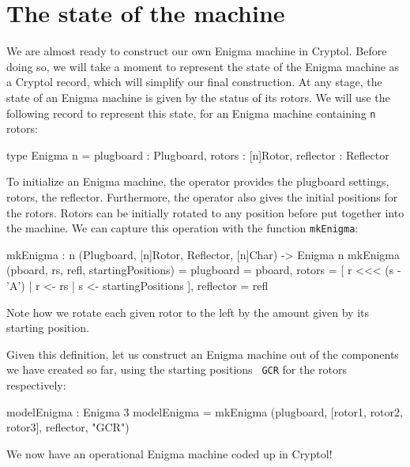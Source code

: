 \section{The state of the machine}
\label{sec:state-machine}

We are almost ready to construct our own Enigma machine in
Cryptol. Before doing so, we will take a moment to represent the state
of the Enigma machine as a Cryptol record\indTheRecordType, which will
simplify our final construction. At any stage, the state of an Enigma
machine is given by the status of its rotors. We will use the
following record to represent this state, for an Enigma machine
containing \texttt{n} rotors:
\begin{code}
  type Enigma n = { plugboard : Plugboard,
                    rotors    : [n]Rotor,
                    reflector : Reflector
                  }
\end{code}
To initialize an Enigma machine, the operator provides the plugboard
settings, rotors, the reflector. Furthermore, the operator also gives
the initial positions for the rotors.  Rotors can be initially rotated
to any position before put together into the machine. We can capture
this operation with the function {\tt mkEnigma}:
\begin{code}
  mkEnigma : {n} (Plugboard, [n]Rotor, Reflector, [n]Char) 
                 -> Enigma n
  mkEnigma (pboard, rs, refl, startingPositions) =
      { plugboard  = pboard,
        rotors     = [ r <<< (s - 'A')
                     | r <- rs
                     | s <- startingPositions
                     ],
        reflector  = refl
      }
\end{code}
Note how we rotate each given rotor to the left by the amount given by
its starting position.


Given this definition, let us construct an Enigma machine out of the
components we have created so far, using the starting positions {\tt
  GCR} for the rotors respectively:\label{def:modelEnigma}
\begin{code}
  modelEnigma : Enigma 3
  modelEnigma = mkEnigma (plugboard, [rotor1, rotor2, rotor3], 
                          reflector, "GCR")
\end{code}
We now have an operational Enigma machine coded up in Cryptol!


